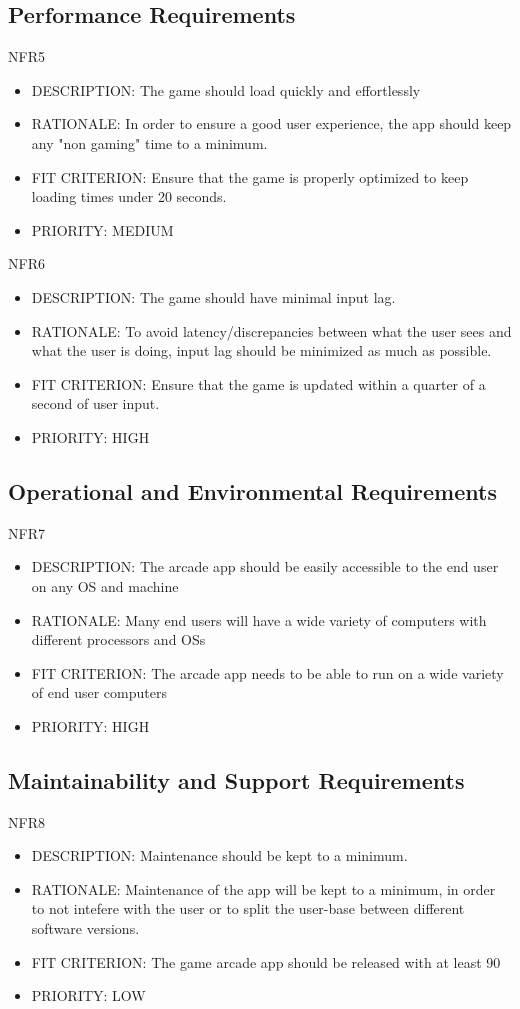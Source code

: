 \documentclass[12pt, titlepage]{article}
\begin{document}
\subsection{Performance Requirements}
NFR5
\begin{itemize}
    \item DESCRIPTION: The game should load quickly and effortlessly
    \item RATIONALE: In order to ensure a good user experience, the app should keep any
"non gaming" time to a minimum.
    \item FIT CRITERION: Ensure that the game is properly optimized to keep loading times under
20 seconds.
    \item PRIORITY: MEDIUM
\end{itemize}

NFR6
\begin{itemize}
    \item DESCRIPTION: The game should have minimal input lag.
    \item RATIONALE: To avoid latency/discrepancies between what the user sees and what the user is doing,
input lag should be minimized as much as possible.
    \item FIT CRITERION: Ensure that the game is updated within a quarter of a second of user input.
    \item PRIORITY: HIGH
\end{itemize}

\subsection{Operational and Environmental Requirements}
NFR7
\begin{itemize}
    \item DESCRIPTION: The arcade app should be easily accessible to the end user on any OS and machine
    \item RATIONALE: Many end users will have a wide variety of computers with different processors and OSs
    \item FIT CRITERION: The arcade app needs to be able to run on a wide variety of end user
computers
    \item PRIORITY: HIGH
\end{itemize}

\subsection{Maintainability and Support Requirements}
NFR8
\begin{itemize}
    \item DESCRIPTION:  Maintenance should be kept to a minimum.
    \item RATIONALE: Maintenance of the app will be kept to a minimum, in order to not
intefere with the user or to split the user-base between different software versions.
    \item FIT CRITERION: The game arcade app should be released with at least 90%
    \item PRIORITY: LOW
\end{itemize}
\end{document}
